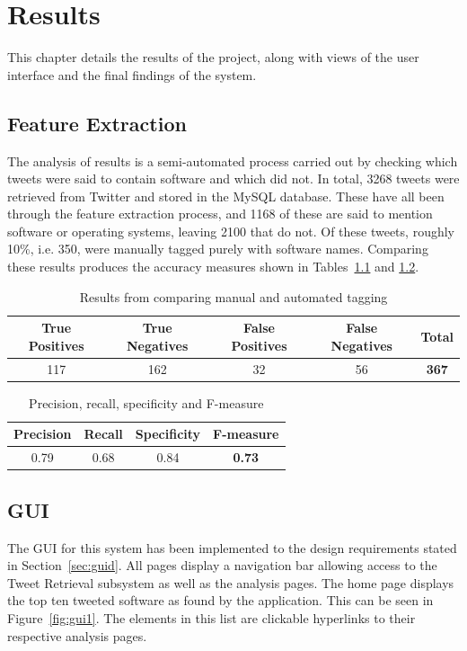 \chapter{Results}
\label{cha:results}
This chapter details the results of the project, along with views of the user interface and the final findings of the system.

\section{Feature Extraction}
The analysis of results is a semi-automated process carried out by checking which tweets were said to contain software and which did not. In total, 3268 tweets were retrieved from Twitter and stored in the MySQL database. These have all been through the feature extraction process, and 1168 of these are said to mention software or operating systems, leaving 2100 that do not. Of these tweets, roughly 10\%, i.e. 350, were manually tagged purely with software names. Comparing these results produces the accuracy measures shown in Tables~\ref{tbl:truefalse} and \ref{tbl:measures}.

\begin{table}[h]
\begin{center}
\begin{tabular}{|c|c|c|c|c|}\hline
True Positives&True Negatives&False Positives&False Negatives&\textbf{Total}\\\hline
117&162&32&56&\textbf{367}\\\hline
\end{tabular}
\end{center}
\caption{Results from comparing manual and automated tagging}
\label{tbl:truefalse}
\end{table}

\begin{table}[h]
\begin{center}
\begin{tabular}{|c|c|c|c|}\hline
Precision&Recall&Specificity&\textbf{F-measure}\\\hline
0.79&0.68&0.84&\textbf{0.73}\\\hline
\end{tabular}
\end{center}
\caption{Precision, recall, specificity and F-measure}
\label{tbl:measures}
\end{table}



\section{GUI}
The GUI for this system has been implemented to the design requirements stated in Section~\ref{sec:guid}. All pages display a navigation bar allowing access to the Tweet Retrieval subsystem as well as the analysis pages. The home page displays the top ten tweeted software as found by the application. This can be seen in Figure~\ref{fig:gui1}. The elements in this list are clickable hyperlinks to their respective analysis pages.

